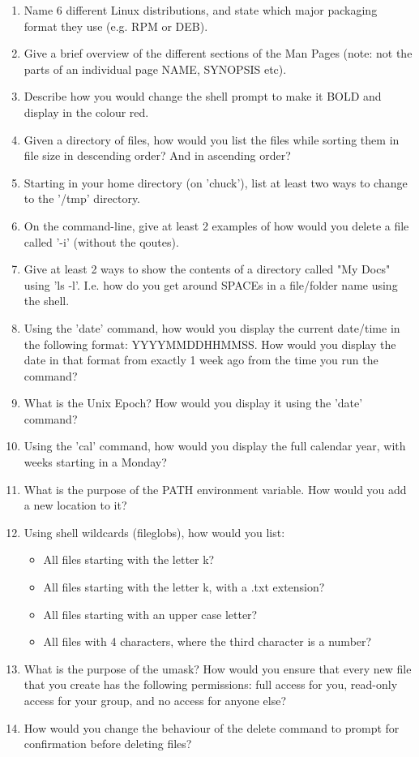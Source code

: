 \documentclass[paper=a4, fontsize=11pt]{scrartcl} %
\numberwithin{equation}{section} %
\numberwithin{figure}{section} %
\numberwithin{table}{section} %
\begin{document}
\begin{enumerate}
\item Name 6 different Linux distributions, and state which major packaging format they use (e.g. RPM or DEB).
\item Give a brief overview of the different sections of the Man Pages (note: not the parts of an individual page NAME, SYNOPSIS etc).
\item Describe how you would change the shell prompt to make it BOLD and display in the colour red.
\item Given a directory of files, how would you list the files while sorting them in file size in descending order? And in ascending order?
\item Starting in your home directory (on 'chuck'), list at least two ways to change to the '/tmp' directory.
\item On the command-line, give at least 2 examples of how would you delete a file called '-i' (without the qoutes).
\item Give at least 2 ways to show the contents of a directory called "My Docs" using 'ls -l'. I.e. how do you get around SPACEs in a file/folder name using the shell.
\item Using the 'date' command, how would you display the current date/time in the following format: YYYYMMDDHHMMSS. How would you display the date in that format from exactly 1 week ago from the time you run the command?
\item What is the Unix Epoch? How would you display it using the 'date' command?
\item Using the 'cal' command, how would you display the full calendar year, with weeks starting in a Monday?
\item What is the purpose of the PATH environment variable. How would you add a new location to it?
\item Using shell wildcards (fileglobs), how would you list:
\begin{itemize}
\item All files starting with the letter k?
\item All files starting with the letter k, with a .txt extension?
\item All files starting with an upper case letter?
\item All files with 4 characters, where the third character is a number?
\end{itemize}
\item What is the purpose of the umask? How would you ensure that every new file that you create has the following permissions: full access for you, read-only access for your group, and no access for anyone else?
\item How would you change the behaviour of the delete command to prompt for confirmation before deleting files?
\end{enumerate}
\end{document}
